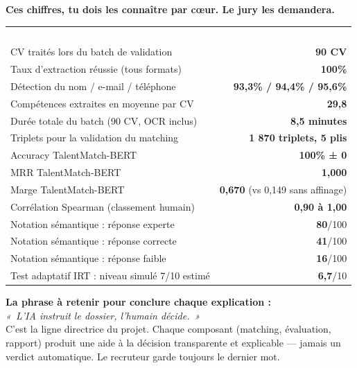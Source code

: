 \documentclass[12pt,a4paper]{article}
\newenvironment{boite}{%
  \def\FrameCommand{\fboxsep=8pt\colorbox{bleulight}}%
  \MakeFramed{\advance\hsize-\width \FrameRestore}%
  \vspace{-4pt}%
}{\endMakeFramed}
\newenvironment{jury}{%
  \def\FrameCommand{\fboxsep=8pt\colorbox{orange!12}}%
  \MakeFramed{\advance\hsize-\width \FrameRestore}%
  \vspace{-4pt}%
}{\endMakeFramed}
\begin{document}
\begin{boite}
\textbf{Ces chiffres, tu dois les connaître par c\oe ur. Le jury les demandera.}

\medskip
\begin{tabularx}{\textwidth}{X r}
\rowcolor{bleu}
\textcolor{white}{\textbf{Indicateur}} & \textcolor{white}{\textbf{Valeur}} \\
CV traités lors du batch de validation & \textbf{90 CV} \\
\rowcolor{bleulight}
Taux d'extraction réussie (tous formats) & \textbf{100\%} \\
Détection du nom / e-mail / téléphone & \textbf{93,3\% / 94,4\% / 95,6\%} \\
\rowcolor{bleulight}
Compétences extraites en moyenne par CV & \textbf{29,8} \\
Durée totale du batch (90 CV, OCR inclus) & \textbf{8,5 minutes} \\
\rowcolor{bleulight}
Triplets pour la validation du matching & \textbf{1 870 triplets, 5 plis} \\
Accuracy TalentMatch-BERT & \textbf{100\% ± 0} \\
\rowcolor{bleulight}
MRR TalentMatch-BERT & \textbf{1,000} \\
Marge TalentMatch-BERT & \textbf{0,670} (vs 0,149 sans affinage) \\
\rowcolor{bleulight}
Corrélation Spearman (classement humain) & \textbf{0,90 à 1,00} \\
Notation sémantique : réponse experte & \textbf{80}/100 \\
\rowcolor{bleulight}
Notation sémantique : réponse correcte & \textbf{41}/100 \\
Notation sémantique : réponse faible & \textbf{16}/100 \\
\rowcolor{bleulight}
Test adaptatif IRT : niveau simulé 7/10 estimé & \textbf{6,7}/10 \\
\bottomrule
\end{tabularx}
\end{boite}

\vspace{16pt}

\begin{jury}
\textbf{La phrase à retenir pour conclure chaque explication :}\\[6pt]
\textit{«~L'IA instruit le dossier, l'humain décide.~»}\\[4pt]
C'est la ligne directrice du projet. Chaque composant (matching, évaluation, rapport) produit une aide à la décision transparente et explicable — jamais un verdict automatique. Le recruteur garde toujours le dernier mot.
\end{jury}
\end{document}
